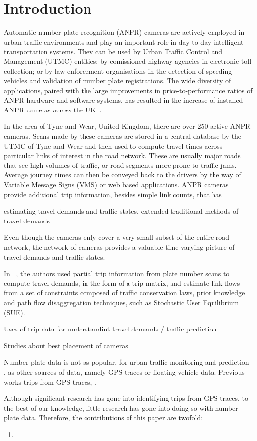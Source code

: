 \section{Introduction}

Automatic number plate recognition (ANPR) cameras are actively employed in urban traffic environments and play an important role in day-to-day intelligent transportation systems. They can be used by Urban Traffic Control and Management (UTMC) entities; by comissioned highway agencies in electronic toll collection; or by law enforcement organisations in the detection of speeding vehicles and validation of number plate registrations. The wide diversity of applications, paired with the large improvements in price-to-performance ratios of ANPR hardware and software systems, has resulted in the increase of installed ANPR cameras across the UK~\cite{EvolutionUTMC2013, SurveyITS2011}.

In the area of Tyne and Wear, United Kingdom, there are over 250 active ANPR cameras. Scans made by these cameras are stored in a central database by the UTMC of Tyne and Wear and then used to compute travel times across particular links of interest in the road network. These are usually major roads that see high volumes of traffic, or road segments more prone to traffic jams. Average journey times can then be conveyed back to the drivers by the way of Variable Message Signs (VMS) or web based applications. ANPR cameras provide additional trip information, besides simple link counts, that has

 estimating travel demands and traffic states. extended traditional methods of  travel demands

Even though the cameras only cover a very small subset of the entire road network, the network of cameras provides a valuable time-varying picture of travel demands and traffic states.

In ~\cite{Castillo2008}, the authors used partial trip information from plate number scans to compute travel demands, in the form of a trip matrix, and estimate link flows from a set of constraints composed of traffic conservation laws, prior knowledge and path flow disaggregation techniques, such as Stochastic User Equilibrium (SUE).


Uses of trip data for understandint travel demands / traffic prediction

Studies about best placement of cameras

Number plate data is not as popular, for urban traffic monitoring and prediction , as other sources of data, namely GPS traces or floating vehicle data.
Previous works trips from GPS traces, .

Although significant research has gone into identifying trips from GPS traces, to the best of our knowledge, little research has gone into doing so with number plate data. Therefore, the contributions of this paper are twofold:

\begin{enumerate}
  \item
\end{enumerate}
